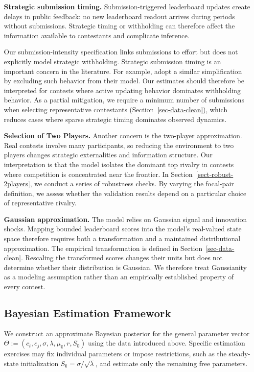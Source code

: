 \documentclass[mnsc]{informs3}
\begin{document}
\textbf{Strategic submission timing.}
Submission-triggered leaderboard updates create delays in public feedback: no new leaderboard readout arrives during periods without submissions. Strategic timing or withholding can therefore affect the information available to contestants and complicate inference.


Our submission-intensity specification links submissions to effort but does not explicitly model strategic withholding.
Strategic submission timing is an important concern in the literature.
For example, \citet{lemus2021dynamic} adopt a similar simplification by excluding such behavior from their model.
Our estimates should therefore be interpreted for contests where active updating behavior dominates withholding behavior.
As a partial mitigation, we require a minimum number of submissions when selecting representative contestants (Section~\ref{sec-data-clean}), which reduces cases where sparse strategic timing dominates observed dynamics.


\textbf{Selection of Two Players.}
Another concern is the two-player approximation.
Real contests involve many participants, so reducing the environment to two players changes strategic externalities and information structure.
Our interpretation is that the model isolates the dominant top rivalry in contests where competition is concentrated near the frontier.
In Section~\ref{sect-robust-2players}, we conduct a series of robustness checks.
By varying the focal-pair definition, we assess whether the validation results depend on a particular choice of representative rivalry.

\textbf{Gaussian approximation.}
The model relies on Gaussian signal and innovation shocks. Mapping bounded leaderboard scores into the model's real-valued state space therefore requires both a transformation and a maintained distributional approximation. The empirical transformation is defined in Section~\ref{sec-data-clean}. Rescaling the transformed scores changes their units but does not determine whether their distribution is Gaussian. We therefore treat Gaussianity as a modeling assumption rather than an empirically established property of every contest.



\subsection{Bayesian Estimation Framework}

{We construct an approximate Bayesian posterior for the general parameter vector $\Theta:=(c_i,c_j,\sigma,\lambda,\mu_0,r,S_0)$ using the data introduced above. Specific estimation exercises may fix individual parameters or impose restrictions, such as the steady-state initialization $S_0=\sigma/\sqrt\lambda$, and estimate only the remaining free parameters.}
\end{document}
